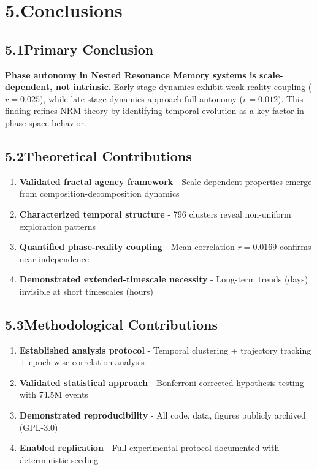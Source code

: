 \documentclass[11pt]{article}
\begin{document}
\section*{5.\quad Conclusions}

\subsection*{5.1\quad Primary Conclusion}

\textbf{Phase autonomy in Nested Resonance Memory systems is scale-dependent, not intrinsic}. Early-stage dynamics exhibit weak reality coupling ($r=0.025$), while late-stage dynamics approach full autonomy ($r=0.012$). This finding refines NRM theory by identifying temporal evolution as a key factor in phase space behavior.

\subsection*{5.2\quad Theoretical Contributions}

\begin{enumerate}
    \item \textbf{Validated fractal agency framework} - Scale-dependent properties emerge from composition-decomposition dynamics
    \item \textbf{Characterized temporal structure} - 796 clusters reveal non-uniform exploration patterns
    \item \textbf{Quantified phase-reality coupling} - Mean correlation $r=0.0169$ confirms near-independence
    \item \textbf{Demonstrated extended-timescale necessity} - Long-term trends (days) invisible at short timescales (hours)
\end{enumerate}

\subsection*{5.3\quad Methodological Contributions}

\begin{enumerate}
    \item \textbf{Established analysis protocol} - Temporal clustering + trajectory tracking + epoch-wise correlation analysis
    \item \textbf{Validated statistical approach} - Bonferroni-corrected hypothesis testing with 74.5M events
    \item \textbf{Demonstrated reproducibility} - All code, data, figures publicly archived (GPL-3.0)
    \item \textbf{Enabled replication} - Full experimental protocol documented with deterministic seeding
\end{enumerate}
\end{document}
